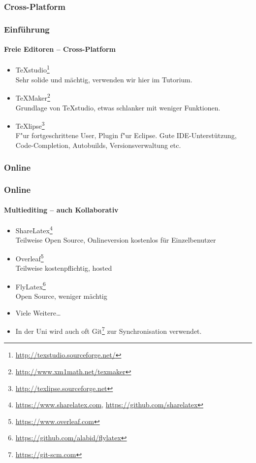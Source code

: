 \subsubsection{Cross-Platform}
\begin{frame}
\frametitle{Einf\"uhrung}
\framesubtitle{Freie Editoren -- Cross-Platform}
\begin{itemize}
  \item TeXstudio\footnote{\url{http://texstudio.sourceforge.net/}}\\
  Sehr solide und mächtig, verwenden wir hier im Tutorium.
  \item TeXMaker\footnote{\url{http://www.xm1math.net/texmaker}}\\
   Grundlage von TeXstudio, etwas schlanker mit weniger Funktionen.
  \item TeXlipse\footnote{\url{http://texlipse.sourceforge.net}}\\ F"ur fortgeschrittene User, Plugin f"ur
  Eclipse. Gute IDE-Unterst\"utzung, Code-Completion, Autobuilds, Versionsverwaltung etc.
\end{itemize}
\end{frame}


\subsubsection{Online}
\begin{frame}
\frametitle{Online}
\framesubtitle{Multiediting -- auch Kollaborativ}
\begin{itemize}
  \item ShareLatex\footnote{\url{https://www.sharelatex.com}, \url{https://github.com/sharelatex}}\\
  Teilweise Open Source, Onlineversion kostenlos für Einzelbenutzer
  \item Overleaf\footnote{\url{https://www.overleaf.com}}\\
  Teilweise kostenpflichtig, hosted
  \item FlyLatex\footnote{\url{https://github.com/alabid/flylatex}}\\ 
  Open Source, weniger mächtig
  \item Viele Weitere\ldots
  \vspace{7mm}
  \item In der Uni wird auch oft Git\footnote{\url{https://git-scm.com}} zur Synchronisation verwendet.
\end{itemize}
\end{frame}


